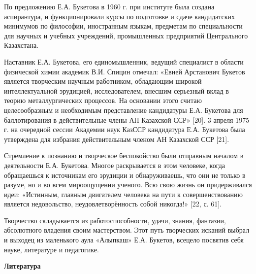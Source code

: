 \begin{multicols}{2}
По предложению Е.А. Букетова в 1960 г. при институте была создана
аспирантура, и функционировали курсы по подготовке и сдаче кандидатских
минимумов по философии, иностранным языкам, предметам по специальности
для научных и учебных учреждений, промышленных предприятий Центрального
Казахстана.

Наставник Е.А. Букетова, его единомышленник, ведущий специалист в
области физической химии академик В.И. Спицин отмечал: «Евней Арстанович
Букетов является творческим научным работником, обладающим широкой
интеллектуальной эрудицией, исследователем, внесшим серьезный вклад в
теорию металлургических процессов. На основании этого считаю
целесообразным и необходимым представление кандидатуры Е.А. Букетова для
баллотирования в действительные члены АН Казахской ССР» {[}20{]}. 3
апреля 1975 г. на очередной сессии Академии наук КазССР кандидатура Е.А.
Букетова была утверждена для избрания действительным членом АН Казахской
ССР {[}21{]}.

Стремление к познанию и творческое беспокойство были отправным началом в
деятельности Е.А. Букетова. Многое раскрывается в этом человеке, когда
обращаешься к источникам его эрудиции и обнаруживаешь, что они не только
в разуме, но и во всем мироощущении ученого. Всю свою жизнь он
придерживался идеи: «Истинным, главным двигателем человека на пути к
совершенствованию является недовольство, неудовлетворённость собой
никогда!» {[}22, с. 61{]}.

Творчество складывается из работоспособности, удачи, знания, фантазии,
абсолютного владения своим мастерством. Этот путь творческих исканий
выбрал и выходец из маленького аула «Алыпкаш» Е.А. Букетов, всецело
посвятив себя науке, литературе и педагогике.
\end{multicols}

\begin{center}
{\bfseries Литература}
\end{center}

